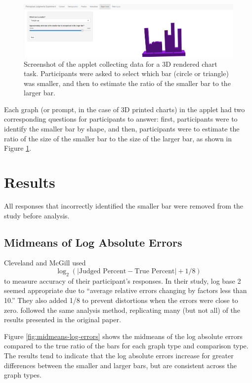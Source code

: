 \documentclass[letterpaper,inpress,dvipsnames]{jdsart}
\begin{document}
\begin{figure}
\includegraphics[width=0.8\linewidth]{_images/05-Experiment-05-filled-in} \caption{Screenshot of the applet collecting data for a 3D rendered chart task. Participants were asked to select which bar (circle or triangle) was smaller, and then to estimate the ratio of the smaller bar to the larger bar.}\label{fig:experiment3dRender}
\end{figure}

Each graph (or prompt, in the case of 3D printed charts) in the applet had two corresponding questions for participants to answer: first, participants were to identify the smaller bar by shape, and then, participants were to estimate the ratio of the size of the smaller bar to the size of the larger bar, as shown in Figure \ref{fig:experiment3dRender}.

\hypertarget{results}{%
\section{Results}\label{results}}

All responses that incorrectly identified the smaller bar were removed from the study before analysis.

\hypertarget{midmeans-of-log-absolute-errors}{%
\subsection{Midmeans of Log Absolute Errors}\label{midmeans-of-log-absolute-errors}}

Cleveland and McGill used
\[\log_2(|\text{Judged Percent} - \text{True Percent}|+1/8)\]
to measure accuracy of their participant's responses.
In their study, log base 2 seemed appropriate due to ``average relative errors changing by factors less than 10.''
They also added 1/8 to prevent distortions when the errors were close to zero.
\citet{heerCrowdsourcingGraphicalPerception2010b} followed the same analysis method, replicating many (but not all) of the results presented in the original paper.

Figure \ref{fig:midmeans-log-errors} shows the midmeans of the log absolute errors compared to the true ratio of the bars for each graph type and comparison type.
The results tend to indicate that the log absolute errors increase for greater differences between the smaller and larger bars, but are consistent across the graph types.
\end{document}
